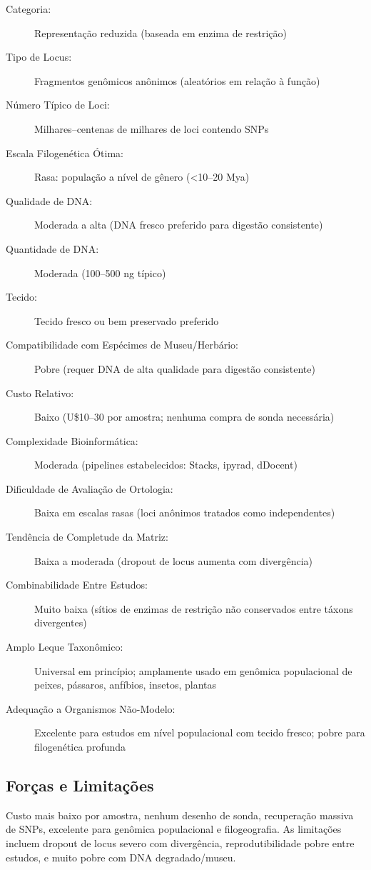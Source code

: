 \begin{description}
\item[Categoria:] Representação reduzida (baseada em enzima de restrição)
\item[Tipo de Locus:] Fragmentos genômicos anônimos (aleatórios em relação à função)
\item[Número Típico de Loci:] Milhares--centenas de milhares de loci contendo SNPs
\item[Escala Filogenética Ótima:] Rasa: população a nível de gênero (<10--20 Mya)
\item[Qualidade de DNA:] Moderada a alta (DNA fresco preferido para digestão consistente)
\item[Quantidade de DNA:] Moderada (100--500 ng típico)
\item[Tecido:] Tecido fresco ou bem preservado preferido
\item[Compatibilidade com Espécimes de Museu/Herbário:] Pobre (requer DNA de alta qualidade para digestão consistente)
\item[Custo Relativo:] Baixo (U\$10--30 por amostra; nenhuma compra de sonda necessária)
\item[Complexidade Bioinformática:] Moderada (pipelines estabelecidos: Stacks, ipyrad, dDocent)
\item[Dificuldade de Avaliação de Ortologia:] Baixa em escalas rasas (loci anônimos tratados como independentes)
\item[Tendência de Completude da Matriz:] Baixa a moderada (dropout de locus aumenta com divergência)
\item[Combinabilidade Entre Estudos:] Muito baixa (sítios de enzimas de restrição não conservados entre táxons divergentes)
\item[Amplo Leque Taxonômico:] Universal em princípio; amplamente usado em genômica populacional de peixes, pássaros, anfíbios, insetos, plantas
\item[Adequação a Organismos Não-Modelo:] Excelente para estudos em nível populacional com tecido fresco; pobre para filogenética profunda
\end{description}

\subsection{Forças e Limitações}

Custo mais baixo por amostra, nenhum desenho de sonda, recuperação massiva de SNPs, excelente para genômica populacional e filogeografia. As limitações incluem dropout de locus severo com divergência, reprodutibilidade pobre entre estudos, e muito pobre com DNA degradado/museu.

